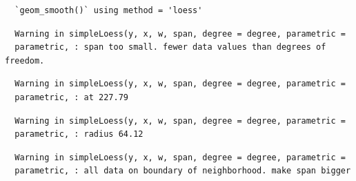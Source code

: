 \documentclass[12pt,twoside]{reedthesis}
\begin{document}
  \begin{Shaded}
  \begin{Highlighting}[]
  \NormalTok{(}\StringTok{ }\NormalTok{()+}\StringTok{ }\NormalTok{(~}\StringTok{ }\StringTok{ }\NormalTok{()+}\NormalTok{()+}\NormalTok{(} \NormalTok{(} \NormalTok{, } \NormalTok{), } \NormalTok{(} \NormalTok{), } \NormalTok{(}\NormalTok{), }\NormalTok{(} \NormalTok{,} \NormalTok{), } \NormalTok{)+}\StringTok{ }\NormalTok{()}
  \end{Highlighting}
  \end{Shaded}
  
  \begin{verbatim}
  `geom_smooth()` using method = 'loess'
  \end{verbatim}
  
  \begin{verbatim}
  Warning in simpleLoess(y, x, w, span, degree = degree, parametric =
  parametric, : span too small. fewer data values than degrees of freedom.
  \end{verbatim}
  
  \begin{verbatim}
  Warning in simpleLoess(y, x, w, span, degree = degree, parametric =
  parametric, : at 227.79
  \end{verbatim}
  
  \begin{verbatim}
  Warning in simpleLoess(y, x, w, span, degree = degree, parametric =
  parametric, : radius 64.12
  \end{verbatim}
  
  \begin{verbatim}
  Warning in simpleLoess(y, x, w, span, degree = degree, parametric =
  parametric, : all data on boundary of neighborhood. make span bigger
  \end{verbatim}
  
\end{document}
